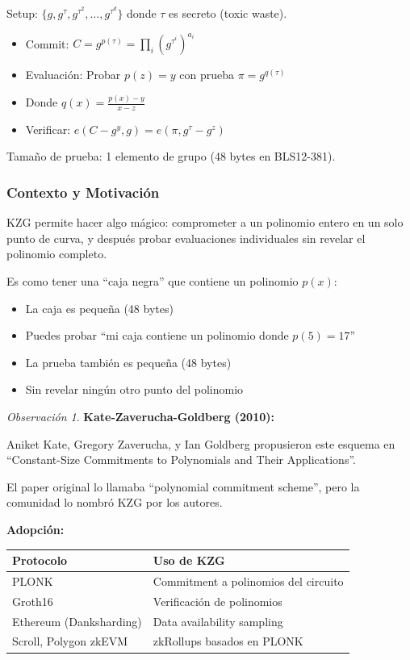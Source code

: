 \documentclass[11pt,a4paper,twoside,openright]{book}
\theoremstyle{definition}
\theoremstyle{plain}
\theoremstyle{remark}
\newtheorem{remark}{Observación}[chapter]
\begin{document}
Setup: $\{g, g^\tau, g^{\tau^2}, \ldots, g^{\tau^d}\}$ donde $\tau$ es secreto (toxic waste).

\begin{itemize}
    \item Commit: $C = g^{p(\tau)} = \prod_i (g^{\tau^i})^{a_i}$
    \item Evaluación: Probar $p(z) = y$ con prueba $\pi = g^{q(\tau)}$
    \item Donde $q(x) = \frac{p(x) - y}{x - z}$
    \item Verificar: $e(C - g^y, g) = e(\pi, g^\tau - g^z)$
\end{itemize}

Tamaño de prueba: 1 elemento de grupo (48 bytes en BLS12-381).

\subsubsection{Contexto y Motivación}

\begin{intuicion}
KZG permite hacer algo mágico: comprometer a un polinomio entero en un solo punto de curva, y después probar evaluaciones individuales sin revelar el polinomio completo.

Es como tener una ``caja negra'' que contiene un polinomio $p(x)$:
\begin{itemize}
    \item La caja es pequeña (48 bytes)
    \item Puedes probar ``mi caja contiene un polinomio donde $p(5) = 17$''
    \item La prueba también es pequeña (48 bytes)
    \item Sin revelar ningún otro punto del polinomio
\end{itemize}
\end{intuicion}

\begin{remark}
\textbf{Kate-Zaverucha-Goldberg (2010):}

Aniket Kate, Gregory Zaverucha, y Ian Goldberg propusieron este esquema en ``Constant-Size Commitments to Polynomials and Their Applications''.

El paper original lo llamaba ``polynomial commitment scheme'', pero la comunidad lo nombró KZG por los autores.

\textbf{Adopción:}
\begin{center}
\begin{tabular}{ll}
\toprule
\textbf{Protocolo} & \textbf{Uso de KZG} \\
\midrule
PLONK & Commitment a polinomios del circuito \\
Groth16 & Verificación de polinomios \\
Ethereum (Danksharding) & Data availability sampling \\
Scroll, Polygon zkEVM & zkRollups basados en PLONK \\
\bottomrule
\end{tabular}
\end{center}
\end{remark}
\end{document}
